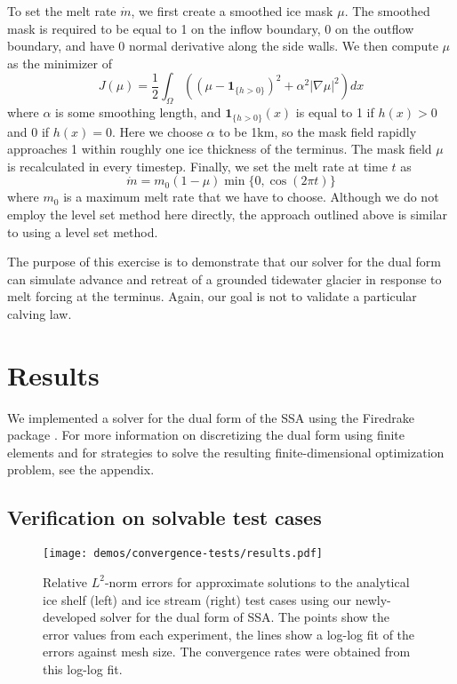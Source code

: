 \documentclass[review,oneside]{igs}
\begin{document}
To set the melt rate $\dot m$, we first create a smoothed ice mask $\mu$.
The smoothed mask is required to be equal to 1 on the inflow boundary, 0 on the outflow boundary, and have 0 normal derivative along the side walls.
We then compute $\mu$ as the minimizer of
\begin{equation}
    J(\mu) = \frac{1}{2}\int_\Omega\left((\mu - \mathbf{1}_{\{h > 0\}})^2 + \alpha^2|\nabla\mu|^2\right)dx
\end{equation}
where $\alpha$ is some smoothing length, and $\mathbf{1}_{\{h > 0\}}(x)$ is equal to 1 if $h(x) > 0$ and 0 if $h(x) = 0$.
Here we choose $\alpha$ to be 1km, so the mask field rapidly approaches 1 within roughly one ice thickness of the terminus.
The mask field $\mu$ is recalculated in every timestep.
Finally, we set the melt rate at time $t$ as
\begin{equation}
    \dot m = m_0(1 - \mu)\min\{0, \cos(2\pi t)\}
\end{equation}
where $m_0$ is a maximum melt rate that we have to choose.
Although we do not employ the level set method here directly, the approach outlined above is similar to using a level set method.

The purpose of this exercise is to demonstrate that our solver for the dual form can simulate advance and retreat of a grounded tidewater glacier in response to melt forcing at the terminus.
Again, our goal is not to validate a particular calving law.


\section{Results}

We implemented a solver for the dual form of the SSA using the Firedrake package \citep{FiredrakeUserManual}.
For more information on discretizing the dual form using finite elements and for strategies to solve the resulting finite-dimensional optimization problem, see the appendix.


\subsection{Verification on solvable test cases} \label{sec:linear-ice-shelf}

\begin{figure}[h]
    \begin{center}
        \texttt{[image: demos/convergence-tests/results.pdf]}
    \end{center}
    \caption{Relative $L^2$-norm errors for approximate solutions to the analytical ice shelf (left) and ice stream (right) test cases using our newly-developed solver for the dual form of SSA.
    The points show the error values from each experiment, the lines show a log-log fit of the errors against mesh size.
    The convergence rates were obtained from this log-log fit.}
    \label{fig:linear-glacier-convergence-rate}
\end{figure}
\end{document}
